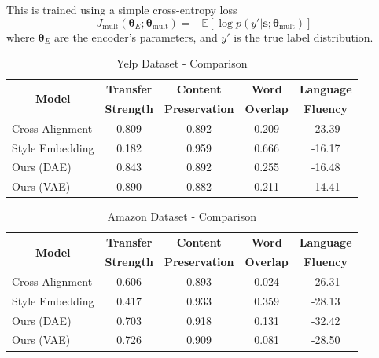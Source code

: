 \documentclass[11pt,a4paper]{article}
\newcommand{\tabh}[1]{\multicolumn{1}{c|}{\textbf{#1}}}
\newcommand{\tabc}[2]{\multicolumn{1}{|c|}{\multirow{#1}{*}{\textbf{#2}}}}
\newcommand{\loss}[1]{J_\text{#1}}
\begin{document}
This is trained using a simple cross-entropy loss
\begin{equation} \label{eqn:multi-task-loss}
	\loss{mult}(\bm\theta_{E};\bm\theta_\text{mult}) =
	- \mathbb{E} [\log p(y' | \bm s; \bm\theta_\text{mult})]
\end{equation}
where $\bm\theta_E$ are the encoder's parameters, and $y'$ is the true label distribution.


\begin{table}[ht]
	\centering
	\begin{tabular}{| l | c | c | c | c |}
		\hline
		\tabc{2}{Model}                       & \tabh{Transfer} & \tabh{Content}      & \tabh{Word}    & \tabh{Language} \\
		                                      & \tabh{Strength} & \tabh{Preservation} & \tabh{Overlap} & \tabh{Fluency}  \\
		\hline
		\hline
		Cross-Alignment \citep{shen2017style} & 0.809           & 0.892               & 0.209          & -23.39          \\
		\hline
		Style Embedding \citep{fu2017style}   & 0.182           & 0.959               & 0.666          & -16.17          \\
		\hline
		Ours (DAE)                            & 0.843           & 0.892               & 0.255          & -16.48          \\
		\hline
		Ours (VAE)                            & 0.890           & 0.882               & 0.211          & -14.41          \\
		\hline
	\end{tabular}
	\caption{Yelp Dataset - Comparison}
	\label{tab:yelp-comparison-previous}
\end{table}

\begin{table}[ht]
	\centering
	\begin{tabular}{| l | c | c | c | c |}
		\hline
		\tabc{2}{Model}                       & \tabh{Transfer} & \tabh{Content}      & \tabh{Word}    & \tabh{Language} \\
		                                      & \tabh{Strength} & \tabh{Preservation} & \tabh{Overlap} & \tabh{Fluency}  \\
		\hline
		\hline
		Cross-Alignment \citep{shen2017style} & 0.606           & 0.893               & 0.024          & -26.31          \\
		\hline
		Style Embedding \citep{fu2017style}   & 0.417           & 0.933               & 0.359          & -28.13          \\
		\hline
		Ours (DAE)                            & 0.703           & 0.918               & 0.131          & -32.42          \\
		\hline
		Ours (VAE)                            & 0.726           & 0.909               & 0.081          & -28.50          \\
		\hline
	\end{tabular}
	\caption{Amazon Dataset - Comparison}
	\label{tab:amazon-comparison-previous}
\end{table}
\end{document}
